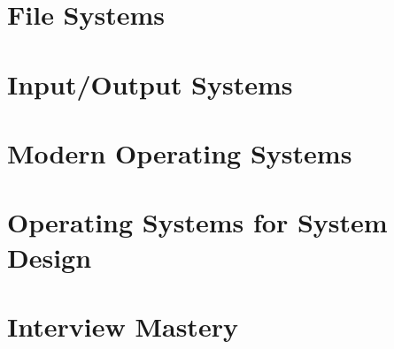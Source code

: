 \documentclass[a4paper,11pt]{book}
\begin{document}
\part{File Systems}





\part{Input/Output Systems}



\part{Modern Operating Systems}






\part{Operating Systems for System Design}





\part{Interview Mastery}








\end{document}
